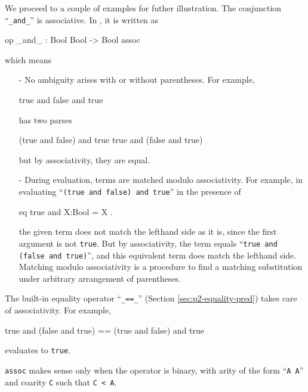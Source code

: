 \documentclass[a4paper]{memoir}
\begin{document}
We proceed to a couple of examples for futher illustration.
The conjunction ``\verb|_and_|'' is associative.
In \cafeobj, it is written as
\begin{vvtm}
\begin{ccode}
   op _and_ : Bool Bool -> Bool { assoc }
\end{ccode}
\end{vvtm}
which means
\begin{itemize}
\item[-] No ambiguity arises with or without parentheses. For example,
  \begin{vvtm}
\begin{ccode}
     true and false and true
  \end{ccode}
\end{vvtm}
  has two parses
  \begin{vvtm}
\begin{ccode}
     (true and false) and true
     true and (false and true)
  \end{ccode}
\end{vvtm}
  but by associativity, they are equal.
\item[-] During evaluation, terms are matched modulo
  associativity. For example, in evaluating \newline
  ``\verb|(true and false) and true|'' in the presence of
  \begin{vvtm}
\begin{ccode}
     eq true and X:Bool = X .
  \end{ccode}
\end{vvtm}
  the given term does not match the lefthand side as it is, since the first
  argument is not \verb|true|. But by associativity,
  the term equals ``\verb|true and (false and true)|'', and this
  equivalent term does match the lefthand side. Matching modulo
  associativity is a procedure to find a matching substitution under
  arbitrary arrangement of parentheses.
\end{itemize}
The built-in equality operator ``\verb|_==_|''
(Section \ref{sec:p2-equality-pred}) takes care of associativity.
For example,
\begin{vvtm}
\begin{ccode}
   true and (false and true) == (true and false) and true
\end{ccode}
\end{vvtm}
evaluates to \verb|true|.

\verb|assoc| makes sense only when the operator is binary,
with arity of the form ``\verb|A A|'' and coarity \verb|C| such that
\verb|C < A|.
\end{document}
